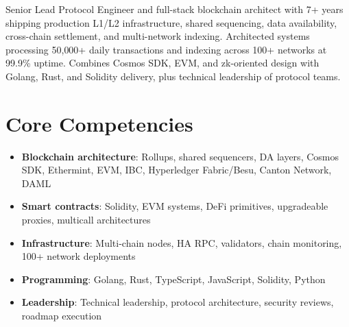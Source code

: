 \documentclass[11pt,a4paper,sans]{moderncv}
\begin{document}
\makecvtitle

\vspace{6pt}
\small{Senior Lead Protocol Engineer and full-stack blockchain architect with 7+ years shipping production L1/L2 infrastructure, shared sequencing, data availability, cross-chain settlement, and multi-network indexing. Architected systems processing 50{,}000+ daily transactions and indexing across 100+ networks at 99.9\% uptime. Combines Cosmos SDK, EVM, and zk-oriented design with Golang, Rust, and Solidity delivery, plus technical leadership of protocol teams.}

\section{Core Competencies}
\vspace{1pt}
\begin{itemize}
\item \textbf{Blockchain architecture}: Rollups, shared sequencers, DA layers, Cosmos SDK, Ethermint, EVM, IBC, Hyperledger Fabric/Besu, Canton Network, DAML
\item \textbf{Smart contracts}: Solidity, EVM systems, DeFi primitives, upgradeable proxies, multicall architectures
\item \textbf{Infrastructure}: Multi-chain nodes, HA RPC, validators, chain monitoring, 100+ network deployments
\item \textbf{Programming}: Golang, Rust, TypeScript, JavaScript, Solidity, Python
\item \textbf{Leadership}: Technical leadership, protocol architecture, security reviews, roadmap execution
\end{itemize}
\end{document}
